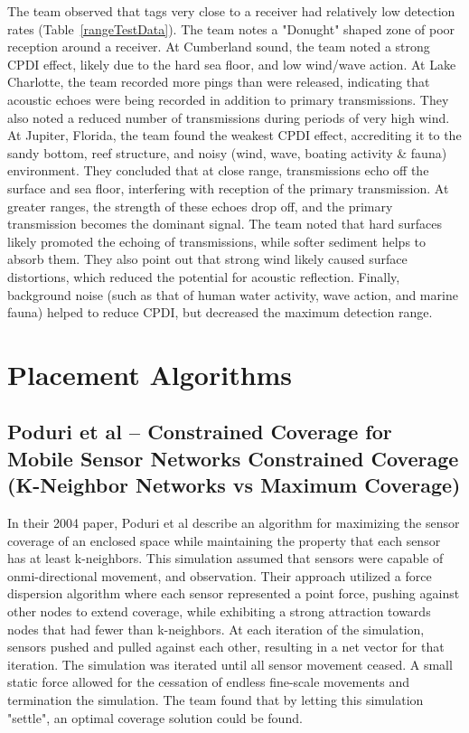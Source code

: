 The team observed that tags very close to a receiver had relatively low detection rates (Table~\ref{rangeTestData}).  The team notes a "Donught" shaped zone of poor reception around a receiver.  At Cumberland sound, the team noted a strong CPDI effect, likely due to the hard sea floor, and low wind/wave action.  At Lake Charlotte, the team recorded more pings than were released, indicating that acoustic echoes were being recorded in addition to primary transmissions.   They also noted a reduced number of transmissions during periods of very high wind.  At Jupiter, Florida, the team found the weakest CPDI effect, accrediting it to the sandy bottom, reef structure, and noisy (wind, wave, boating activity \& fauna) environment.  They concluded that at close range, transmissions echo off the surface and sea floor, interfering with reception of the primary transmission.  At greater ranges, the strength of these echoes drop off, and the primary transmission becomes the dominant signal.  The team noted that hard surfaces likely promoted the echoing of transmissions, while softer sediment helps to absorb them.  They also point out that strong wind likely caused surface distortions, which reduced the potential for acoustic reflection.  Finally, background noise (such as that of human water activity, wave action, and marine fauna) helped to reduce CPDI, but decreased the maximum detection range.



\section{Placement Algorithms}
\subsection{Poduri et al – Constrained Coverage for Mobile Sensor Networks Constrained Coverage (K-Neighbor Networks vs Maximum Coverage)}
In their 2004 paper, Poduri et al\cite{Poduri2004} describe an algorithm for maximizing the sensor coverage of an enclosed space while maintaining the property that each sensor has at least k-neighbors.  This simulation assumed that sensors were capable of onmi-directional movement, and observation.  Their approach utilized a force dispersion algorithm where each sensor represented a point force, pushing against other nodes to extend coverage, while exhibiting a strong attraction towards nodes that had fewer than k-neighbors.  At each iteration of the simulation, sensors pushed and pulled against each other, resulting in a net vector for that iteration.  The simulation was iterated until all sensor movement ceased.  A small static force allowed for the cessation of endless fine-scale movements and termination the simulation.  The team found that by letting this simulation "settle", an optimal coverage solution could be found.  

